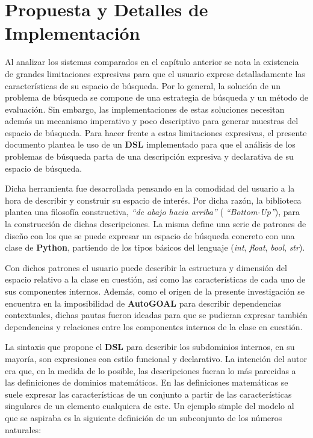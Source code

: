 \chapter{Propuesta y Detalles de Implementación}\label{chapter:proposal}

Al analizar los sistemas comparados en el capítulo anterior se nota la existencia
de grandes limitaciones expresivas para que el usuario exprese detalladamente las
características de su espacio de búsqueda. Por lo general, la solución de un problema de 
búsqueda se compone de una estrategia de búsqueda y un método de evaluación. 
Sin embargo, las implementaciones de estas soluciones necesitan además un mecanismo 
imperativo y poco descriptivo para generar muestras del espacio de búsqueda. 
Para hacer frente a estas limitaciones expresivas, el presente documento plantea le 
uso de un {\bf DSL} implementado para que el análisis de los problemas de búsqueda 
parta de una descripción expresiva y declarativa de su espacio de búsqueda.

Dicha herramienta fue desarrollada pensando en la comodidad del usuario a la hora de
describir y construir su espacio de interés. Por dicha razón, la biblioteca plantea
una filosofía constructiva, {\it “de abajo hacia arriba”} ({ \it “Bottom-Up”}), para la
construcción de dichas descripciones. La misma define una serie de patrones de diseño
con los que se puede expresar un espacio de búsqueda concreto con una clase de {\bf Python}, 
partiendo de los tipos básicos del lenguaje ({\it int}, {\it float}, {\it bool}, {\it str}).

Con dichos patrones el usuario puede describir la estructura y dimensión del espacio
relativo a la clase en cuestión, así como las características de cada uno de sus
componentes internos. Además, como el origen de la presente investigación se encuentra
en la imposibilidad de {\bf AutoGOAL} para describir dependencias contextuales, dichas pautas
fueron ideadas para que se pudieran expresar también dependencias y relaciones entre los
componentes internos de la clase en cuestión.

La sintaxis que propone el {\bf DSL} para describir los subdominios internos, en su mayoría,
son expresiones con estilo funcional y declarativo. La intención del autor era que,
en la medida de lo posible, las descripciones fueran lo más parecidas a las definiciones
de dominios matemáticos. En las definiciones matemáticas se suele expresar las características
de un conjunto a partir de las características singulares de un elemento cualquiera de este.
Un ejemplo simple del modelo al que se aspiraba es la siguiente definición de un subconjunto de
los números naturales:

